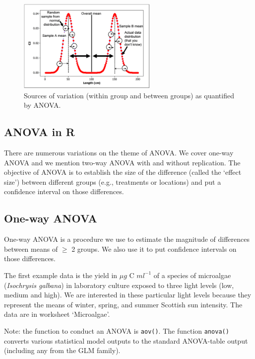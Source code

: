 \documentclass[
  11pt,
  a4paper,
]{book}
\begin{document}
\begin{figure}
\centerline{\includegraphics[width=0.6\textwidth]{figs/ANOVA_sources_of_var.png}}
\caption{Sources of variation (within group and between groups) as quantified by ANOVA.}
\label{fig:var-sources}
\end{figure}

\hypertarget{anova-in-r}{%
\subsection{ANOVA in R}\label{anova-in-r}}

There are numerous variations on the theme of ANOVA. We cover one-way ANOVA and we mention two-way ANOVA with and without replication. The objective of ANOVA is to establish the size of the difference (called the `effect size') between different groups (e.g., treatments or locations) and put a confidence interval on those differences.

\hypertarget{one-way-anova}{%
\subsection{One-way ANOVA}\label{one-way-anova}}

One-way ANOVA is a procedure we use to estimate the magnitude of differences between means of \(\geq\) 2 groups. We also use it to put confidence intervals on those differences.

The first example data is the yield in \(\mu g\) C \(ml^{-1}\) of a species of microalgae (\emph{Isochrysis galbana}) in laboratory culture exposed to three light levels (low, medium and high). We are interested in these particular light levels because they represent the means of winter, spring, and summer Scottish sun intensity. The data are in worksheet `Microalgae'.

Note: the function to conduct an ANOVA is \texttt{aov()}. The function \texttt{anova()} converts various statistical model outputs to the standard ANOVA-table output (including any from the GLM family).
\end{document}
